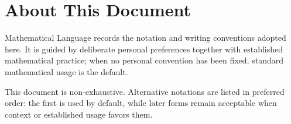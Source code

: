 \section*{About This Document}
\thispagestyle{mathlanguage}

Mathematical Language records the notation and writing conventions adopted here. It is guided by deliberate personal preferences together with established mathematical practice; when no personal convention has been fixed, standard mathematical usage is the default.

This document is non-exhaustive. Alternative notations are listed in preferred order: the first is used by default, while later forms remain acceptable when context or established usage favors them.
